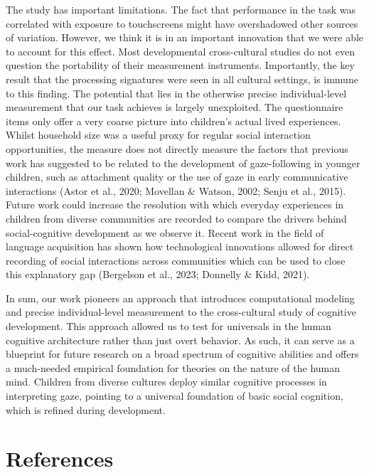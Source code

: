 \documentclass[
  man,floatsintext]{apa6}
\begin{document}
The study has important limitations. The fact that performance in the task was correlated with exposure to touchscreens might have overshadowed other sources of variation. However, we think it is in an important innovation that we were able to account for this effect. Most developmental cross-cultural studies do not even question the portability of their measurement instruments. Importantly, the key result that the processing signatures were seen in all cultural settings, is immune to this finding. The potential that lies in the otherwise precise individual-level measurement that our task achieves is largely unexploited. The questionnaire items only offer a very coarse picture into children's actual lived experiences. Whilst household size was a useful proxy for regular social interaction opportunities, the measure does not directly measure the factors that previous work has suggested to be related to the development of gaze-following in younger children, such as attachment quality or the use of gaze in early communicative interactions (Astor et al., 2020; Movellan \& Watson, 2002; Senju et al., 2015). Future work could increase the resolution with which everyday experiences in children from diverse communities are recorded to compare the drivers behind social-cognitive development as we observe it. Recent work in the field of language acquisition has shown how technological innovations allowed for direct recording of social interactions across communities which can be used to close this explanatory gap (Bergelson et al., 2023; Donnelly \& Kidd, 2021).

In sum, our work pioneers an approach that introduces computational modeling and precise individual-level measurement to the cross-cultural study of cognitive development. This approach allowed us to test for universals in the human cognitive architecture rather than just overt behavior. As such, it can serve as a blueprint for future research on a broad spectrum of cognitive abilities and offers a much-needed empirical foundation for theories on the nature of the human mind. Children from diverse cultures deploy similar cognitive processes in interpreting gaze, pointing to a universal foundation of basic social cognition, which is refined during development.

\newpage

\hypertarget{references}{%
\section{References}\label{references}}
\end{document}
